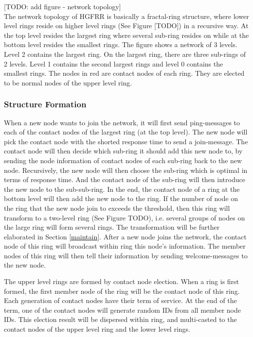 [TODO: add figure - network topology]\\

The network topology of HGFRR is basically a fractal-ring structure, where lower level rings reside on higher level rings (See Figure [TODO]) in a recursive way. At the top level resides the largest ring where several sub-ring resides on while at the bottom level resides the smallest rings. The figure shows a network of 3 levels. Level 2 contains the largest ring. On the largest ring, there are three sub-rings of 2 levels. Level 1 contains the second largest rings and level 0 contains the smallest rings. The nodes in red are contact nodes of each ring. They are elected to be normal nodes of the upper level ring.

\subsubsection{Structure Formation} \label{formation}

When a new node wants to join the network, it will first send ping-messages to each of the contact nodes of the largest ring (at the top level). The new node will pick the contact node with the shorted response time to send a join-message. The contact node will then decide which sub-ring it should add this new node to, by sending the node information of contact nodes of each sub-ring back to the new node. Recursively, the new node will then choose the sub-ring which is optimal in terms of response time. And the contact node of the sub-ring will then introduce the new node to the sub-sub-ring. In the end, the contact node of a ring at the bottom level will then add the new node to the ring. If the number of node on the ring that the new node join to exceeds the threshold, then this ring will transform to a two-level ring (See Figure TODO), i.e. several groups of nodes on the large ring will form several rings. The transformation will be further elaborated in Section \cref{maintain}. After a new node joins the network, the contact node of this ring will broadcast within ring this node's information. The member nodes of this ring will then tell their information by sending welcome-messages to the new node.

The upper level rings are formed by contact node election. When a ring is first formed, the first member node of the ring will be the contact node of this ring. Each generation of contact nodes have their term of service. At the end of the term, one of the contact nodes will generate random IDs from all member node IDs. This election result will be dispersed within ring, and multi-casted to the contact nodes of the upper level ring and the lower level rings.


